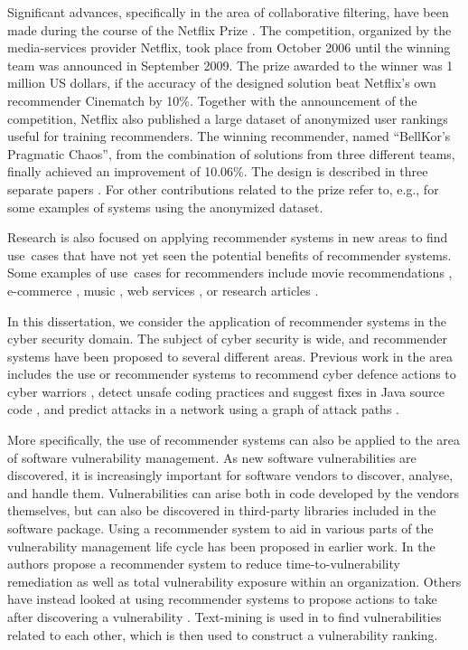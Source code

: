 Significant advances, specifically in the area of collaborative filtering, have been made during the course of the Netflix Prize \cite{netflixprize}.
The competition, organized by the media-services provider Netflix, took place from October 2006 until the winning team was announced in September 2009.
The prize awarded to the winner was 1 million US dollars, if the accuracy of the designed solution beat Netflix's own recommender Cinematch by 10\%.
Together with the announcement of the competition, Netflix also published a large dataset of anonymized user rankings useful for training recommenders.
The winning recommender, named ``BellKor's Pragmatic Chaos'', from the combination of solutions from three different teams, finally achieved an improvement of 10.06\%.
The design is described in three separate papers \cite{koren:2009,toscher:2009,piotte:2009}.
For other contributions related to the prize refer to, e.g., \cite{zhou:2008,takacs:2008} for some examples of systems using the anonymized dataset.

Research is also focused on applying recommender systems in new areas to find use~cases that have not yet seen the potential benefits of recommender systems.
Some examples of use~cases for recommenders include movie recommendations \cite{diao:2014,harper:2015}, e-commerce \cite{huang:2007,castroschez:2011}, music \cite{schedl:2015,kaminskas:2013}, web services \cite{zheng:2009}, or research articles \cite{wang:2018}.

In this dissertation, we consider the application of recommender systems in the cyber security domain.
The subject of cyber security is wide, and recommender systems have been proposed to several different areas.
Previous work in the area includes the use or recommender systems to
recommend cyber defence actions to cyber warriors \cite{lyons:2014},
detect unsafe coding practices and suggest fixes in Java source code \cite{nembhard:2019},
and predict attacks in a network using a graph of attack paths \cite{polatidis:2017}.

More specifically, the use of recommender systems can also be applied to the area of software vulnerability management.
As new software vulnerabilities are discovered, it is increasingly important for software vendors to discover, analyse, and handle them.
Vulnerabilities can arise both in code developed by the vendors themselves, but can also be discovered in third-party libraries included in the software package.
Using a recommender system to aid in various parts of the vulnerability management life cycle has been proposed in earlier work.
In \cite{farris:2018} the authors propose a recommender system to reduce time-to-vulnerability remediation as well as total vulnerability exposure within an organization.
Others have instead looked at using recommender systems to propose actions to take after discovering a vulnerability \cite{gadepally:2016}.
Text-mining is used in \cite{lee:2018} to find vulnerabilities related to each other, which is then used to construct a vulnerability ranking.

